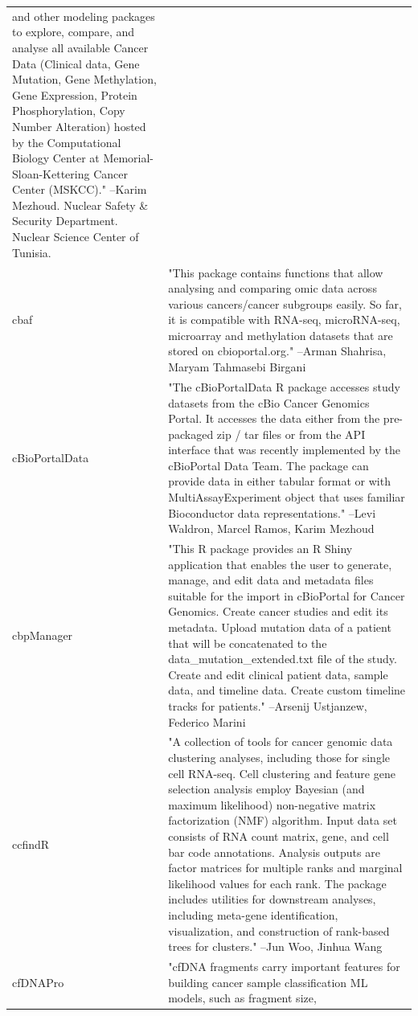 \begin{longtable}[t]{l>{\raggedright\arraybackslash}p{25em}}
and other modeling packages to explore, compare, and analyse
all available Cancer Data (Clinical data, Gene Mutation, Gene
Methylation, Gene Expression, Protein Phosphorylation, Copy
Number Alteration) hosted by the Computational Biology Center
at Memorial-Sloan-Kettering Cancer Center (MSKCC)." --Karim Mezhoud. Nuclear Safety \& Security Department. Nuclear Science Center of Tunisia.\\
cbaf & "This package contains functions that allow analysing and
comparing omic data across various cancers/cancer subgroups
easily. So far, it is compatible with RNA-seq, microRNA-seq,
microarray and methylation datasets that are stored on
cbioportal.org." --Arman Shahrisa, Maryam Tahmasebi Birgani\\
cBioPortalData & "The cBioPortalData R package accesses study datasets from
the cBio Cancer Genomics Portal. It accesses the data either
from the pre-packaged zip / tar files or from the API interface
that was recently implemented by the cBioPortal Data Team. The
package can provide data in either tabular format or with
MultiAssayExperiment object that uses familiar Bioconductor
data representations." --Levi Waldron, Marcel Ramos, Karim Mezhoud\\
cbpManager & "This R package provides an R Shiny application that
enables the user to generate, manage, and edit data and
metadata files suitable for the import in cBioPortal for Cancer
Genomics. Create cancer studies and edit its metadata. Upload
mutation data of a patient that will be concatenated to the
data\_mutation\_extended.txt file of the study. Create and edit
clinical patient data, sample data, and timeline data. Create
custom timeline tracks for patients." --Arsenij Ustjanzew, Federico Marini\\
ccfindR & "A collection of tools for cancer genomic data clustering
analyses, including those for single cell RNA-seq. Cell
clustering and feature gene selection analysis employ Bayesian
(and maximum likelihood) non-negative matrix factorization
(NMF) algorithm. Input data set consists of RNA count matrix,
gene, and cell bar code annotations.  Analysis outputs are
factor matrices for multiple ranks and marginal likelihood
values for each rank. The package includes utilities for
downstream analyses, including meta-gene identification,
visualization, and construction of rank-based trees for
clusters." --Jun Woo, Jinhua Wang\\
\addlinespace
cfDNAPro & "cfDNA fragments carry important features for building
cancer sample classification ML models, such as fragment size,

\end{longtable}
